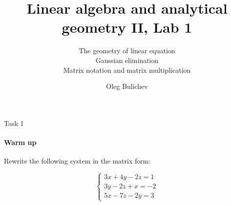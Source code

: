 \documentclass[aspectratio=169]{beamer}
\title{Linear algebra and analytical geometry II, Lab 1} %
\subtitle{The geometry of linear equation\\
          Gaussian elimination\\
          Matrix notation and matrix multiplication} %
\author{Oleg Bulichev}
\newcommand{\fbckg}[1]{\usebackgroundtemplate{\texttt{[image: \#1]}}}%
\begin{document}
\fbckg{fibeamer/figs/title_page.png}

\fbckg{fibeamer/figs/common.png}



\begin{frame}[t]{Task 1}
\framesubtitle{Warm up}
Rewrite the following system in the matrix form:
\begin{Large}
\begin{equation*}
    \left\{\begin{matrix}
       3x + 4y -2z = 1 \\ 
       3y -2z +x = -2 \\ 
       5x - 7z -2y = 3 
       \end{matrix}\right.
\end{equation*}
\end{Large}
\end{frame}
\end{document}

